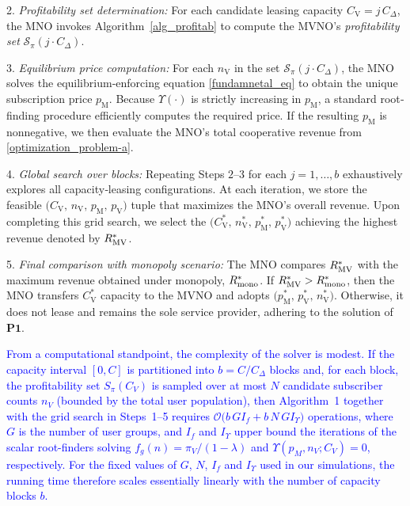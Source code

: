 \documentclass[12pt, draftclsnofoot, onecolumn]{IEEEtran}
\begin{document}
		
		2. \textit{Profitability set determination:} For each candidate leasing capacity \(C_{\mathrm{V}} = j \, C_{\Delta}\), the MNO invokes Algorithm~\ref{alg_profitab} to compute the MVNO’s \emph{profitability set} \(\mathcal{S}_{\pi}(j \cdot C_{\Delta})\). 
		
		3. \textit{Equilibrium price computation:}  For each \(n_{\mathrm{V}}\) in the set \(\mathcal{S}_{\pi}(j \cdot C_{\Delta})\), the MNO solves the equilibrium‐enforcing equation \eqref{fundamnetal_eq}  to obtain the unique subscription price \(p_{\mathrm{M}}\). Because \(\Upsilon(\cdot)\) is strictly increasing in \(p_{\mathrm{M}}\), a standard root‐finding procedure efficiently computes the required price. If the resulting \(p_{\mathrm{M}}\) is nonnegative, we then evaluate the MNO’s total cooperative revenue from \eqref{optimization_problem-a}.
		
		
		4. \textit{Global search over blocks: } 
		Repeating Steps $2$–$3$ for each \(j=1,\dots,b\) exhaustively explores all capacity‐leasing configurations. At each iteration, we store the feasible \(\bigl(C_{\mathrm{V}},\,n_{\mathrm{V}},\,p_{\mathrm{M}},\,p_{\mathrm{V}}\bigr)\) tuple that maximizes the MNO’s overall revenue. Upon completing this grid search, we select the \(\bigl(C_{\mathrm{V}}^*,\,n_{\mathrm{V}}^*,\,p_{\mathrm{M}}^*,\,p_{\mathrm{V}}^*\bigr)\) achieving the highest revenue denoted by \(R^*_{\rm MV}\). 
		
		
		5. \textit{Final comparison with monopoly scenario:}  
		The MNO compares $R^*_{\rm{MV}}$ with the maximum revenue obtained under monopoly, $R^*_{\rm mono}$. If $R^*_{\rm{MV}} > R^*_{\rm mono}$, then the MNO transfers \(C_{\mathrm{V}}^*\) capacity to the MVNO and adopts \(\bigl(p_{\mathrm{M}}^*,\,p_{\mathrm{V}}^*,\,n_{\mathrm{V}}^*\bigr)\). Otherwise, it does not lease and remains the sole service provider, adhering to the solution of \(\mathbf{P1}\).
		
		\textcolor{blue}{From a computational standpoint, the complexity of the solver is modest. 
		If the capacity interval $[0,C]$ is partitioned into $b = C/C_\Delta$ blocks and, for each block, 
		the profitability set $S_\pi(C_V)$ is sampled over at most $N$ candidate subscriber counts $n_V$ 
		(bounded by the total user population), then Algorithm~1 together with the grid search in 
		Steps~1–5 requires
		$\mathcal{O}\bigl(b\,G I_f + b\,N\,G I_\Upsilon\bigr)
		$
		operations, where $G$ is the number of user groups, and $I_f$ and $I_\Upsilon$ upper bound the 
		iterations of the scalar root-finders solving $f_g(n) = \pi_V/(1-\lambda)$ and 
		$\Upsilon(p_M,n_V;C_V)=0$, respectively. For the fixed values of $G$, $N$, $I_f$ and $I_\Upsilon$ 
		used in our simulations, the running time therefore scales essentially linearly with the number of 
		capacity blocks $b$.}
		
\end{document}
